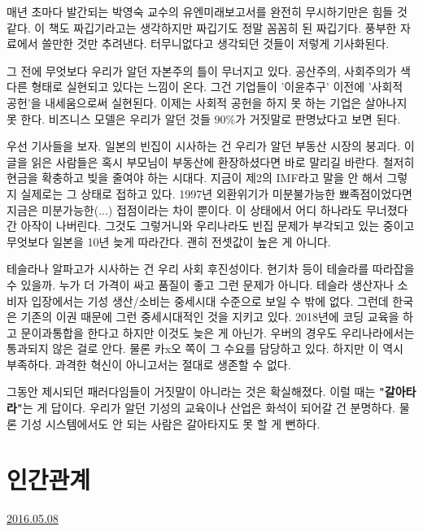 매년 초마다 발간되는 박영숙 교수의 유엔미래보고서를 완전히 무시하기만은 힘들 것 같다.
이 책도 짜깁기라고는 생각하지만 짜깁기도 정말 꼼꼼히 된 짜깁기다. 풍부한 자료에서 쓸만한 것만 추려낸다.
터무니없다고 생각되던 것들이 저렇게 기사화된다.
\vspace{5mm}

그 전에 무엇보다 우리가 알던 자본주의 틀이 무너지고 있다.
공산주의, 사회주의가 색다른 형태로 실현되고 있다는 느낌이 온다.
그건 기업들이 '이윤추구' 이전에 '사회적 공헌'을 내세움으로써 실현된다.
이제는 사회적 공헌을 하지 못 하는 기업은 살아나지 못 한다.
비즈니스 모델은 우리가 알던 것들 90$\%$가 거짓말로 판명났다고 보면 된다.
\vspace{5mm}

우선 기사들을 보자. 일본의 빈집이 시사하는 건 우리가 알던 부동산 시장의 붕괴다.
이 글을 읽은 사람들은 혹시 부모님이 부동산에 환장하셨다면 바로 말리길 바란다. 철저히 현금을 확충하고 빚을 줄여야 하는 시대다.
지금이 제2의 IMF라고 말을 안 해서 그렇지 실제로는 그 상태로 접하고 있다.
1997년 외환위기가 미분불가능한 뾰족점이었다면 지금은 미분가능한(...) 접점이라는 차이 뿐이다.
이 상태에서 어디 하나라도 무너졌다간 아작이 나버린다.
그것도 그렇거니와 우리나라도 빈집 문제가 부각되고 있는 중이고 무엇보다 일본을 10년 늦게 따라간다.
괜히 전셋값이 높은 게 아니다.
\vspace{5mm}

테슬라나 알파고가 시사하는 건 우리 사회 후진성이다.
현기차 등이 테슬라를 따라잡을 수 있을까. 누가 더 가격이 싸고 품질이 좋고 그런 문제가 아니다.
테슬라 생산자나 소비자 입장에서는 기성 생산/소비는 중세시대 수준으로 보일 수 밖에 없다.
그런데 한국은 기존의 이권 때문에 그런 중세시대적인 것을 지키고 있다.
2018년에 코딩 교육을 하고 문이과통합을 한다고 하지만 이것도 늦은 게 아닌가.
우버의 경우도 우리나라에서는 통과되지 않은 걸로 안다. 물론 카x오 쪽이 그 수요를 담당하고 있다.
하지만 이 역시 부족하다. 과격한 혁신이 아니고서는 절대로 생존할 수 없다.
\vspace{5mm}

그동안 제시되던 패러다임들이 거짓말이 아니라는 것은 확실해졌다.
이럴 때는 \textbf{"갈아타라"}는 게 답이다. 우리가 알던 기성의 교육이나 산업은 화석이 되어갈 건 분명하다.
물론 기성 시스템에서도 안 되는 사람은 갈아타지도 못 할 게 뻔하다.
\vspace{5mm}





\section{인간관계}
\href{https://www.kockoc.com/Apoc/765542}{2016.05.08}

